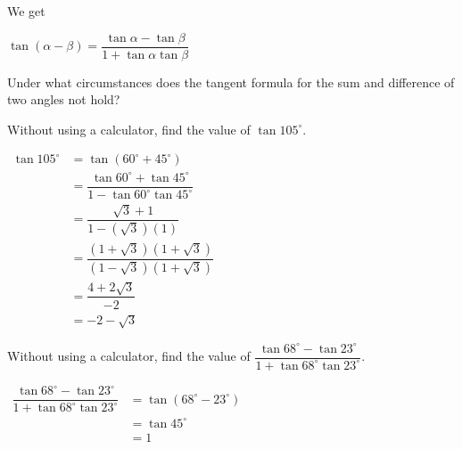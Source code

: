 \documentclass{report}
\begin{document}
We get
\begin{info}
	
	$\tan (\alpha-\beta)=\dfrac{\tan \alpha-\tan \beta}{1+\tan \alpha \tan \beta}$
\end{info}

\begin{think}
	    
	\noindent Under what circumstances does the tangent formula for the sum and difference of two angles not hold?
\end{think}

\begin{question}
	Without using a calculator, find the value of $\tan 105^{\circ}$.
	
	\sol{}
	
	\noindent $\begin{aligned} \tan 105^{\circ} & =\tan \left(60^{\circ}+45^{\circ}\right) \\ & =\dfrac{\tan 60^{\circ}+\tan 45^{\circ}}{1-\tan 60^{\circ} \tan 45^{\circ}} \\ & =\dfrac{\sqrt{3}+1}{1-(\sqrt{3})(1)} \\ & =\dfrac{(1+\sqrt{3})(1+\sqrt{3})}{(1-\sqrt{3})(1+\sqrt{3})} \\ & =\dfrac{4+2 \sqrt{3}}{-2} \\ & =-2-\sqrt{3}\end{aligned}$
\end{question}

\begin{question}
	Without using a calculator, find the value of $\dfrac{\tan 68^{\circ}-\tan 23^{\circ}}{1+\tan 68^{\circ} \tan 23^{\circ}}$.
	
	\sol{}
	
	\noindent $\begin{aligned} \dfrac{\tan 68^{\circ}-\tan 23^{\circ}}{1+\tan 68^{\circ} \tan 23^{\circ}} & =\tan \left(68^{\circ}-23^{\circ}\right) \\ & =\tan 45^{\circ} \\ & =1\end{aligned}$
\end{question}
\end{document}
